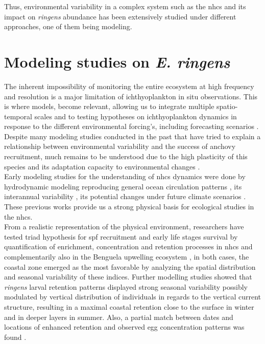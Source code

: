 Thus, environmental variability in a complex system such as the \acrshort{nhcs} and its impact on \textit{\gls{ringens}} abundance has been extensively studied under different approaches, one of them being modeling.\\

\clearpage

\section{Modeling studies on \textit{E. ringens}}\label{Chap1ModeAnch}

The inherent impossibility of monitoring the entire ecosystem at high frequency and resolution is a major limitation of ichthyoplankton in situ observations. This is where models, become relevant, allowing us to integrate multiple spatio-temporal scales and to testing hypotheses on ichthyoplankton dynamics in response to the different  environmental forcing’s, including forecasting scenarios \citep{GearDode2020}.\\

Despite many modeling studies conducted in the past \citep{LettPenv2007,BrocLett2008,GutiRami2008,OlivPena2011,XuChai2013} that have tried to explain a relationship between environmental variability and the success of anchovy recruitment, much remains to be understood due to the high plasticity of this species and its adaptation capacity to environmental changes \citep{EspiBert2008,EspiBert2014,CanaAdas2018,PlazCern2018}.\\

Early modeling studies for the understanding of \acrshort{nhcs} dynamics were done by hydrodynamic modeling reproducing general ocean circulation patterns \citep{PenvEche2005,ColaMcwi2012}, its interannual variability \citep{ColaCape2008,EspiEche2017}, its potential changes under future climate scenarios \citep{OerdCola2015,EcheGeva2020}. These previous works provide us a strong physical basis for ecological studies in the \acrshort{nhcs}.\\

From a realistic representation of the physical environment, researchers have tested \cite{Baku1998} triad hypothesis for \acrshort{spf} recruitment and early life stages survival by quantification of enrichment, concentration and retention processes in \acrshort{nhcs} \citep{LettPenv2007} and complementarily also in the Benguela upwelling ecosystem \citep{LettRoy2006}, in both cases, the coastal zone emerged as the most favorable by analyzing the spatial distribution and seasonal variability of these indices. Further modelling studies showed that \textit{\gls{ringens}} larval retention patterns displayed strong seasonal variability possibly modulated by vertical distribution of individuals in regards to the vertical current structure, resulting in a maximal coastal retention close to the surface in winter and in deeper layers in summer. Also, a partial match between dates and locations of enhanced retention and observed egg concentration patterns was found \citep{BrocLett2008}.\\

